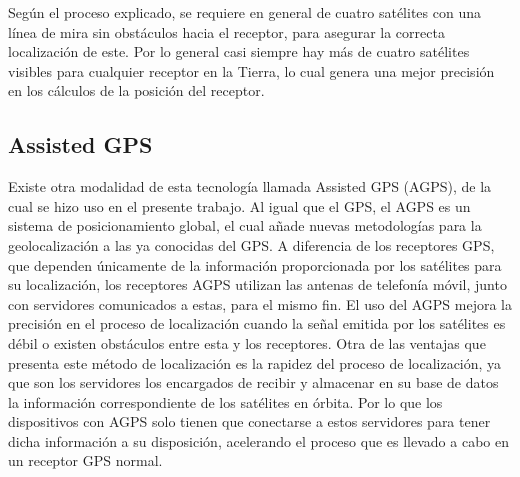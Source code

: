 Según el proceso explicado, se requiere en general de cuatro satélites con una línea de mira sin obstáculos hacia el receptor, para asegurar la correcta localización de este. 
Por lo general casi siempre hay más de cuatro satélites visibles para cualquier receptor en la Tierra, lo cual genera una mejor precisión en los cálculos de la posición del receptor.

\subsection{Assisted GPS}

Existe otra modalidad de esta tecnología llamada Assisted GPS (AGPS), de la cual se hizo uso en el presente trabajo.
Al igual que el GPS, el AGPS es un sistema de posicionamiento global, el cual añade nuevas metodologías para la geolocalización a las ya conocidas del GPS. 
A diferencia de los receptores GPS, que dependen únicamente de la información proporcionada por los satélites para su localización, los receptores AGPS utilizan las antenas de telefonía móvil, junto con servidores comunicados a estas, para el mismo fin. 
El uso del AGPS mejora la precisión en el proceso de localización cuando la señal emitida por los satélites es débil o existen obstáculos entre esta y los receptores. 
Otra de las ventajas que presenta este método de localización es la rapidez del proceso de localización, ya que son los servidores los encargados de recibir y almacenar en su base de datos la información correspondiente de los satélites en órbita. 
Por lo que los dispositivos con AGPS solo tienen que conectarse a estos servidores para tener dicha información a su disposición, acelerando el proceso que es llevado a cabo en un receptor GPS normal.\\

